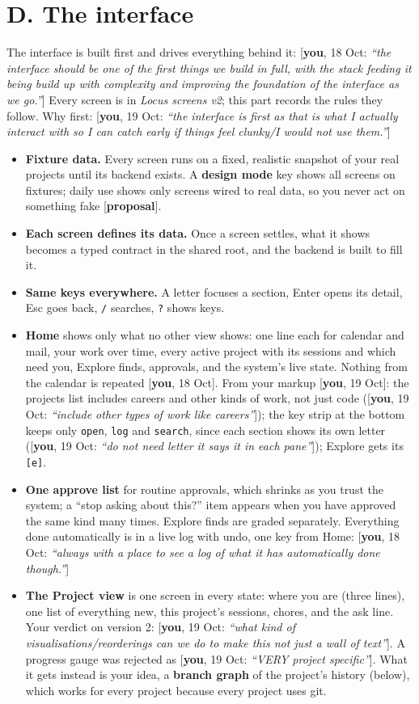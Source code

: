 \documentclass[10pt]{extarticle}
\newcommand{\you}[2]{{\small[\textbf{you}, #1: \textit{``#2''}]}}
\newcommand{\youx}[1]{{\small[\textbf{you}, #1]}}
\newcommand{\prop}{{\small[\textbf{proposal}]}}
\newcommand{\Sec}[1]{\section*{#1}\addcontentsline{toc}{section}{#1}}
\begin{document}
\clearpage
\Sec{D. The interface}

The interface is built first and drives everything behind it: \you{18 Oct}{the interface should be one of the first things we build in full, with the stack feeding it being build up with complexity and improving the foundation of the interface as we go.} Every screen is in \textit{Locus screens v2}; this part records the rules they follow. Why first: \you{19 Oct}{the interface is first as that is what I actually interact with so I can catch early if things feel clunky/I would not use them.}

\begin{itemize}
\item \textbf{Fixture data.} Every screen runs on a fixed, realistic snapshot of your real projects until its backend exists. A \textbf{design mode} key shows all screens on fixtures; daily use shows only screens wired to real data, so you never act on something fake \prop.
\item \textbf{Each screen defines its data.} Once a screen settles, what it shows becomes a typed contract in the shared root, and the backend is built to fill it.
\item \textbf{Same keys everywhere.} A letter focuses a section, Enter opens its detail, Esc goes back, \texttt{/} searches, \texttt{?} shows keys.
\item \textbf{Home} shows only what no other view shows: one line each for calendar and mail, your work over time, every active project with its sessions and which need you, Explore finds, approvals, and the system's live state. Nothing from the calendar is repeated \youx{18 Oct}. From your markup \youx{19 Oct}: the projects list includes careers and other kinds of work, not just code (\you{19 Oct}{include other types of work like careers}); the key strip at the bottom keeps only \texttt{open}, \texttt{log} and \texttt{search}, since each section shows its own letter (\you{19 Oct}{do not need letter it says it in each pane}); Explore gets its \texttt{[e]}.
\item \textbf{One approve list} for routine approvals, which shrinks as you trust the system; a ``stop asking about this?'' item appears when you have approved the same kind many times. Explore finds are graded separately. Everything done automatically is in a live log with undo, one key from Home: \you{18 Oct}{always with a place to see a log of what it has automatically done though.}
\item \textbf{The Project view} is one screen in every state: where you are (three lines), one list of everything new, this project's sessions, chores, and the ask line. Your verdict on version 2: \you{19 Oct}{what kind of visualisations/reorderings can we do to make this not just a wall of text}. A progress gauge was rejected as \you{19 Oct}{VERY project specific}. What it gets instead is your idea, a \textbf{branch graph} of the project's history (below), which works for every project because every project uses git.

\end{itemize}
\end{document}
